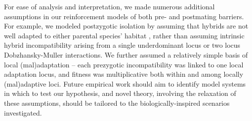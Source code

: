 \documentclass[11pt]{article}
\begin{document}
For ease of analysis and interpretation, we made numerous additional assumptions in our reinforcement models of both pre- and postmating barriers.  
For example, we modeled postzygotic isolation by assuming that hybrids are not well adapted to either parental species' habitat \citep[a.g. ][]{schluter1998}, rather than assuming intrinsic hybrid incompatibility arising from a single underdominant locus or two locus Dobzhansky-Muller interactions.  
We further assumed a relatively simple basis of local (mal)adaptation -- each prezygotic incompatibility was linked to one local adaptation locus, and fitness was multiplicative both within and among locally (mal)adaptive loci. 
Future empirical work should aim to identify model systems in which to test our hypothesis, and novel theory, involving the relaxation of these assumptions, should be tailored to the biologically-inspired scenarios investigated. 

\end{document}
